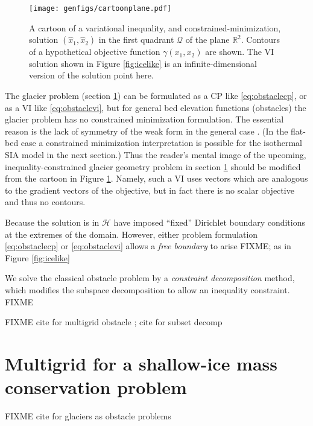 \documentclass[letterpaper,final,12pt,reqno]{amsart}
\newcommand{\RR}{\mathbb{R}}
\begin{document}
\begin{figure}
\texttt{[image: genfigs/cartoonplane.pdf]}
\caption{A cartoon of a variational inequality, and constrained-minimization, solution $(\hat x_1,\hat x_2)$ in the first quadrant $\mathcal{Q}$ of the plane $\RR^2$.  Contours of a hypothetical objective function $\gamma(x_1,x_2)$ are shown.  The VI solution shown in Figure \ref{fig:icelike} is an infinite-dimensional version of the solution point here.}
\label{fig:cartoonplane}
\end{figure}

The glacier problem (section \ref{sec:sia}) can be formulated as a CP like \eqref{eq:obstaclecp}, or as a VI like \eqref{eq:obstaclevi}, but for general bed elevation functions (obstacles) the glacier problem has no constrained minimization formulation.  The essential reason is the lack of symmetry of the weak form in the general case \cite{JouvetBueler2012}.  (In the flat-bed case a constrained minimization interpretation is possible for the isothermal SIA model in the next section.)   Thus the reader's mental image of the upcoming, inequality-constrained glacier geometry problem in section \ref{sec:sia} should be modified from the cartoon in Figure \ref{fig:cartoonplane}.  Namely, such a VI uses vectors which are analogous to the gradient vectors of the objective, but in fact there is no scalar objective and thus no contours.

Because the solution is in $\mathcal{H}$ have imposed ``fixed'' Dirichlet boundary conditions at the extremes of the domain.  However, either problem formulation \eqref{eq:obstaclecp} or \eqref{eq:obstaclevi} allows a \emph{free boundary} to arise FIXME; as in Figure \ref{fig:icelike}

We solve the classical obstacle problem by a \emph{constraint decomposition} \cite{Tai2003} method, which modifies the subspace decomposition to allow an inequality constraint.  FIXME

FIXME cite for multigrid obstacle \cite{BrandtCryer1983,Bueler2021,GraeserKornhuber2009,Jouvetetal2013}; cite for subset decomp \cite{Tai2003}


\section{Multigrid for a shallow-ice mass conservation problem} \label{sec:sia}

FIXME cite for glaciers as obstacle problems \cite{Bueler2016,Bueler2020,Calvoetal2002,JouvetBueler2012}
\end{document}
